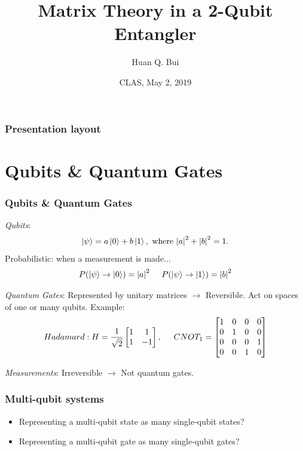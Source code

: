 \documentclass{beamer}
\title{Matrix Theory in a 2-Qubit Entangler}
\author[Huan Q. Bui] %
{Huan Q. Bui}
\institute[Colby College] %
{
	
	Matrix Analysis
	\and
	Professor Leo Livshits
}
\date{CLAS, May 2, 2019}
\theoremstyle{definition}
\begin{document}
 
\frame{\titlepage}
 
\begin{frame}
\frametitle{Presentation layout}
\tableofcontents
\end{frame}

\section{Qubits \& Quantum Gates}

\begin{frame}
\frametitle{Qubits \& Quantum Gates}

\textit{Qubits}:
\begin{align*}
\left\vert{\psi}\right\rangle = a\left\vert{0}\right\rangle + b\left\vert{1}\right\rangle, \text{ where } \abs{a}^2 + \abs{b}^2 = 1. 
\end{align*}
Probabilistic: when a measurement is made...
\begin{align*}
P(\left\vert{\psi}\right\rangle \to \left\vert{0}\right\rangle) = \abs{a}^2\hspace{0.5cm}
P(\left\vert{\psi}\right\rangle \to \left\vert{1}\right\rangle) = \abs{b}^2
\end{align*}

\textit{Quantum Gates}: Represented by unitary matrices $\rightarrow$ Reversible. Act on spaces of one or many qubits. Example: 
\begin{align*}
Hadamard: H = \frac{1}{\sqrt{2}}\begin{bmatrix}
1&1\\1&-1
\end{bmatrix}, \hspace{0.5cm}
CNOT_1 = \begin{bmatrix}
1&0&0&0\\
0&1&0&0\\
0&0&0&1\\
0&0&1&0
\end{bmatrix}
\end{align*}

\textit{Measurements}: Irreversible $\rightarrow$ Not quantum gates.
\end{frame}


\begin{frame}
\frametitle{Multi-qubit systems}

\begin{itemize}

\item Representing a multi-qubit state as many single-qubit states?
\item Representing a multi-qubit gate as many single-qubit gates?
\end{itemize}
\end{frame}
\end{document}
